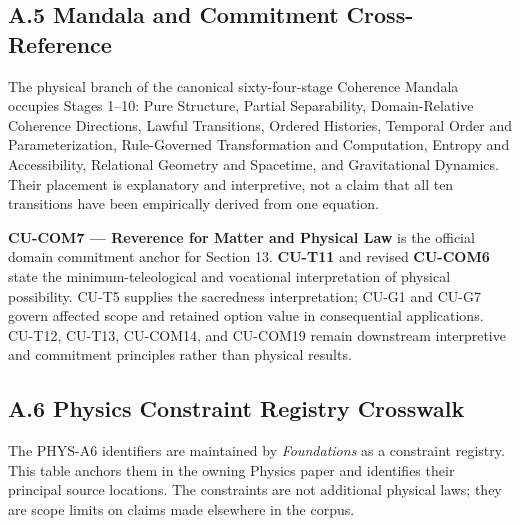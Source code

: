 \documentclass[
  11pt,
]{article}
\begin{document}
\subsection{A.5 Mandala and Commitment
Cross-Reference}\label{a.5-mandala-and-commitment-cross-reference}

The physical branch of the canonical sixty-four-stage Coherence Mandala
occupies Stages 1--10: Pure Structure, Partial Separability,
Domain-Relative Coherence Directions, Lawful Transitions, Ordered
Histories, Temporal Order and Parameterization, Rule-Governed
Transformation and Computation, Entropy and Accessibility, Relational
Geometry and Spacetime, and Gravitational Dynamics. Their placement is
explanatory and interpretive, not a claim that all ten transitions have
been empirically derived from one equation.

\textbf{CU-COM7 --- Reverence for Matter and Physical Law} is the
official domain commitment anchor for Section 13. \textbf{CU-T11} and
revised \textbf{CU-COM6} state the minimum-teleological and vocational
interpretation of physical possibility. CU-T5 supplies the sacredness
interpretation; CU-G1 and CU-G7 govern affected scope and retained
option value in consequential applications. CU-T12, CU-T13, CU-COM14,
and CU-COM19 remain downstream interpretive and commitment principles
rather than physical results.

\subsection{A.6 Physics Constraint Registry
Crosswalk}\label{a.6-physics-constraint-registry-crosswalk}

The PHYS-A6 identifiers are maintained by \emph{Foundations} as a
constraint registry. This table anchors them in the owning Physics paper
and identifies their principal source locations. The constraints are not
additional physical laws; they are scope limits on claims made elsewhere
in the corpus.
\end{document}
